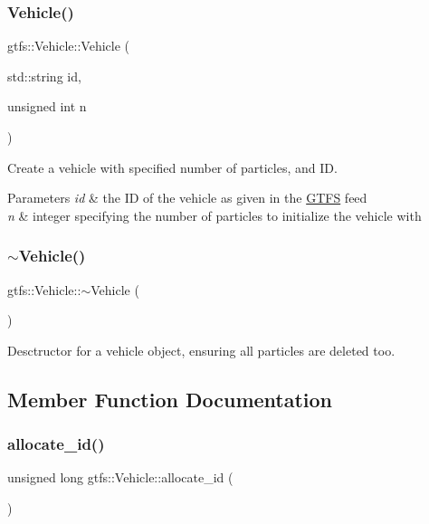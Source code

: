 \subsubsection{\texorpdfstring{Vehicle()}{Vehicle()}\hspace{0.1cm}{\footnotesize\ttfamily [2/2]}}
{\footnotesize\ttfamily gtfs\+::\+Vehicle\+::\+Vehicle (\begin{DoxyParamCaption}\item[{std\+::string}]{id,  }\item[{unsigned int}]{n }\end{DoxyParamCaption})}

Create a vehicle with specified number of particles, and ID.


\begin{DoxyParams}{Parameters}
{\em id} & the ID of the vehicle as given in the \hyperlink{classgtfs_1_1GTFS}{G\+T\+FS} feed \\
\hline
{\em n} & integer specifying the number of particles to initialize the vehicle with \\
\hline
\end{DoxyParams}
\mbox{\label{classgtfs_1_1Vehicle_a08c7450dd0df9406f78b30be044d27d8}} 
\subsubsection{\texorpdfstring{$\sim$\+Vehicle()}{~Vehicle()}}
{\footnotesize\ttfamily gtfs\+::\+Vehicle\+::$\sim$\+Vehicle (\begin{DoxyParamCaption}{ }\end{DoxyParamCaption})}

Desctructor for a vehicle object, ensuring all particles are deleted too. 

\subsection{Member Function Documentation}
\mbox{\label{classgtfs_1_1Vehicle_aa9087e973a9821f384ec47f51bdcedc7}} 
\subsubsection{\texorpdfstring{allocate\+\_\+id()}{allocate\_id()}}
{\footnotesize\ttfamily unsigned long gtfs\+::\+Vehicle\+::allocate\+\_\+id (\begin{DoxyParamCaption}{ }\end{DoxyParamCaption})}

